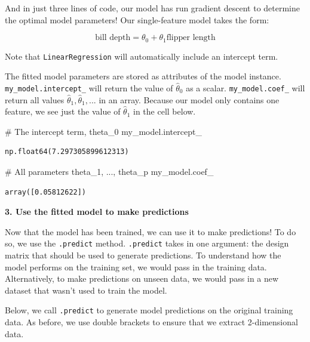 \documentclass[
  letterpaper,
  DIV=11,
  numbers=noendperiod]{scrreprt}
\newenvironment{Shaded}{\begin{snugshade}}{\end{snugshade}}
\newcommand{\CommentTok}[1]{\textcolor[rgb]{0.37,0.37,0.37}{#1}}
\newcommand{\NormalTok}[1]{\textcolor[rgb]{0.00,0.23,0.31}{#1}}
\begin{document}
And in just three lines of code, our model has run gradient descent to
determine the optimal model parameters! Our single-feature model takes
the form:

\[\text{bill depth} = \theta_0 + \theta_1 \text{flipper length}\]

Note that \texttt{LinearRegression} will automatically include an
intercept term.

The fitted model parameters are stored as attributes of the model
instance. \texttt{my\_model.intercept\_} will return the value of
\(\hat{\theta}_0\) as a scalar. \texttt{my\_model.coef\_} will return
all values \(\hat{\theta}_1,
\hat{\theta}_1, ...\) in an array. Because our model only contains one
feature, we see just the value of \(\hat{\theta}_1\) in the cell below.

\begin{Shaded}
\begin{Highlighting}[]
\CommentTok{\# The intercept term, theta\_0}
\NormalTok{my\_model.intercept\_}
\end{Highlighting}
\end{Shaded}

\begin{verbatim}
np.float64(7.297305899612313)
\end{verbatim}

\begin{Shaded}
\begin{Highlighting}[]
\CommentTok{\# All parameters theta\_1, ..., theta\_p}
\NormalTok{my\_model.coef\_}
\end{Highlighting}
\end{Shaded}

\begin{verbatim}
array([0.05812622])
\end{verbatim}

\textbf{3. Use the fitted model to make predictions}

Now that the model has been trained, we can use it to make predictions!
To do so, we use the \texttt{.predict} method. \texttt{.predict} takes
in one argument: the design matrix that should be used to generate
predictions. To understand how the model performs on the training set,
we would pass in the training data. Alternatively, to make predictions
on unseen data, we would pass in a new dataset that wasn't used to train
the model.

Below, we call \texttt{.predict} to generate model predictions on the
original training data. As before, we use double brackets to ensure that
we extract 2-dimensional data.
\end{document}
